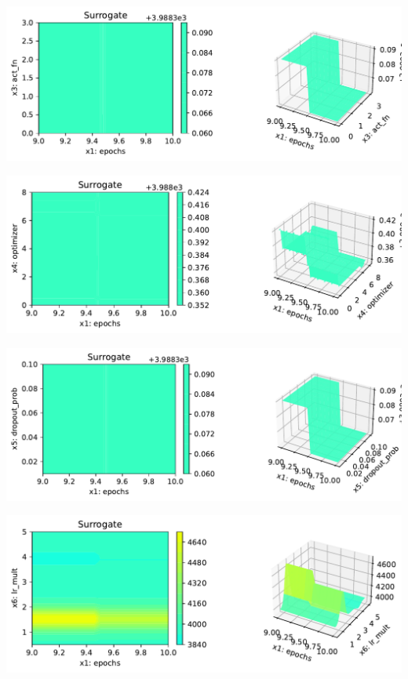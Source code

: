 \documentclass[
  letterpaper,
  DIV=11,
  numbers=noendperiod]{scrreprt}
\begin{document}
\includegraphics{031_spot_lightning_linear_diabetes_files/figure-pdf/cell-19-output-3.pdf}

\includegraphics{031_spot_lightning_linear_diabetes_files/figure-pdf/cell-19-output-4.pdf}

\includegraphics{031_spot_lightning_linear_diabetes_files/figure-pdf/cell-19-output-5.pdf}

\includegraphics{031_spot_lightning_linear_diabetes_files/figure-pdf/cell-19-output-6.pdf}
\end{document}
